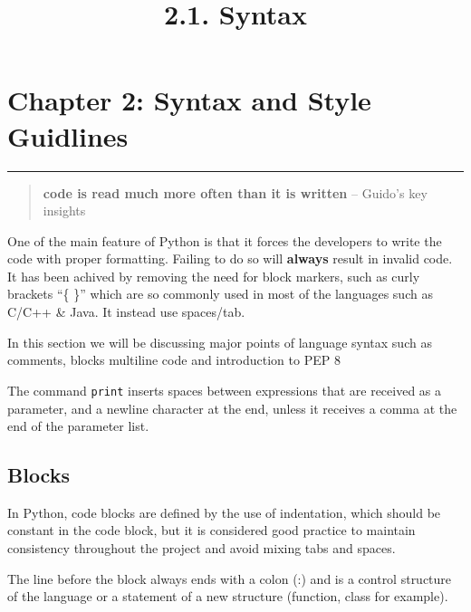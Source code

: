 \documentclass[11pt]{article}
\title{2.1. Syntax}
\begin{document}
    
    
    \maketitle
    
    

    
    \hypertarget{chapter-2-syntax-and-style-guidlines}{%
\section{Chapter 2: Syntax and Style
Guidlines}\label{chapter-2-syntax-and-style-guidlines}}

\begin{center}\rule{0.5\linewidth}{\linethickness}\end{center}

    \begin{quote}
\textbf{code is read much more often than it is written} -- Guido's key
insights
\end{quote}

One of the main feature of Python is that it forces the developers to
write the code with proper formatting. Failing to do so will
\textbf{always} result in invalid code. It has been achived by removing
the need for block markers, such as curly brackets ``\{ \}'' which are
so commonly used in most of the languages such as C/C++ \& Java. It
instead use spaces/tab.

In this section we will be discussing major points of language syntax
such as comments, blocks multiline code and introduction to PEP 8

    The command \texttt{print} inserts spaces between expressions that are
received as a parameter, and a newline character at the end, unless it
receives a comma at the end of the parameter list.

\hypertarget{blocks}{%
\subsection{Blocks}\label{blocks}}

In Python, code blocks are defined by the use of indentation, which
should be constant in the code block, but it is considered good practice
to maintain consistency throughout the project and avoid mixing tabs and
{spaces}.

The line before the block always ends with a colon (:) and is a control
structure of the language or a statement of a new structure (function,
class for example).
\end{document}
